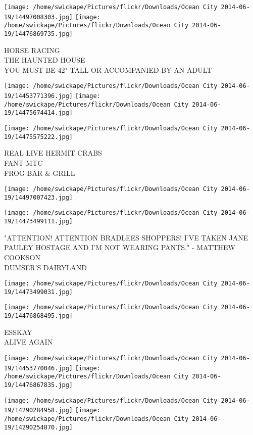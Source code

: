 \documentclass[10pt,letterpaper]{article}
\begin{document}
\vspace{0.25in}
\texttt{[image: /home/swickape/Pictures/flickr/Downloads/Ocean City 2014-06-19/14497008303.jpg]}
\texttt{[image: /home/swickape/Pictures/flickr/Downloads/Ocean City 2014-06-19/14476869735.jpg]}

HORSE RACING\\
THE HAUNTED HOUSE\\
YOU MUST BE 42" TALL OR ACCOMPANIED BY AN ADULT
\pagebreak

\texttt{[image: /home/swickape/Pictures/flickr/Downloads/Ocean City 2014-06-19/14453771396.jpg]}
\texttt{[image: /home/swickape/Pictures/flickr/Downloads/Ocean City 2014-06-19/14475674414.jpg]}

\texttt{[image: /home/swickape/Pictures/flickr/Downloads/Ocean City 2014-06-19/14475575222.jpg]}

REAL LIVE HERMIT CRABS\\
FANT MTC\\
FROG BAR \& GRILL
\pagebreak

\texttt{[image: /home/swickape/Pictures/flickr/Downloads/Ocean City 2014-06-19/14497007423.jpg]}

\vspace{0.25in}
\texttt{[image: /home/swickape/Pictures/flickr/Downloads/Ocean City 2014-06-19/14473499111.jpg]}

"ATTENTION!  ATTENTION BRADLEES SHOPPERS!  I'VE TAKEN JANE PAULEY HOSTAGE AND I'M NOT WEARING PANTS." {-} MATTHEW COOKSON\\
DUMSER'S DAIRYLAND
\pagebreak

\texttt{[image: /home/swickape/Pictures/flickr/Downloads/Ocean City 2014-06-19/14473499031.jpg]}

\vspace{0.25in}
\texttt{[image: /home/swickape/Pictures/flickr/Downloads/Ocean City 2014-06-19/14476868495.jpg]}

ESSKAY\\
ALIVE AGAIN
\pagebreak

\texttt{[image: /home/swickape/Pictures/flickr/Downloads/Ocean City 2014-06-19/14453770046.jpg]}
\texttt{[image: /home/swickape/Pictures/flickr/Downloads/Ocean City 2014-06-19/14476867835.jpg]}

\texttt{[image: /home/swickape/Pictures/flickr/Downloads/Ocean City 2014-06-19/14290284958.jpg]}
\texttt{[image: /home/swickape/Pictures/flickr/Downloads/Ocean City 2014-06-19/14290254870.jpg]}
\end{document}
